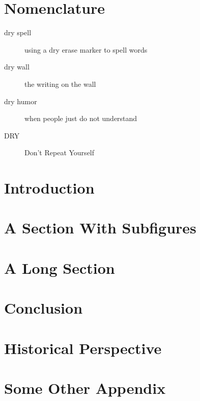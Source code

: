 \documentclass[pdf,ps2pdf,12pt,strict,blank,OUO]{SANDreport}
\begin{document}
    \section*{Nomenclature}
    \begin{description}
	\item[dry spell]
	    using a dry erase marker to spell words
	\item[dry wall]
	    the writing on the wall
	\item[dry humor]
	    when people just do not understand
	\item[DRY]
	    Don't Repeat Yourself
    \end{description}


    \SANDmain		%

    \section{Introduction}
	\label{Intro}
	


    \section{A Section With Subfigures}
	


    \section{A Long Section}\label{sec:long}
	


    \section{Conclusion}
	

    \nocite{*}


    \clearpage
    \providecommand*{\phantomsection}{}
    \phantomsection
    
    


    \appendix
    \section{Historical Perspective}
	


    \section{Some Other Appendix}
	

    
\end{document}
